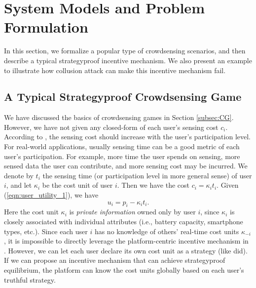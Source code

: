 \documentclass[conference]{IEEEtran}
\theoremstyle{definition}
\begin{document}
{\color{black}
\section{System Models and Problem Formulation}
\label{sec:PFSM}
{\color{black}
In this section, we formalize a popular type of crowdsensing scenarios, and then describe a typical strategyproof incentive mechanism. We also present an example to illustrate how collusion attack can make this incentive mechanism fail. %
}

\subsection{\color{black} A Typical Strategyproof Crowdsensing Game}
We have discussed the basics of crowdsensing games in Section \ref{subsec:CG}. However, we have not given any closed-form of each user\rq{}s sensing cost $c_i$. According to \cite{koutsopoulos2013optimal}, the sensing cost should increase with the user\rq{}s participation level. For real-world applications, usually sensing time can be a good metric of each user's participation. For example, more time the user spends on sensing, more sensed data the user can contribute, and more sensing cost may be incurred. We denote by $t_i$ the sensing time (or participation level in more general sense) of user $i$, and let $\kappa_i$ be the cost unit of user $i$. Then we have the cost $c_i=\kappa_it_i$. Given (\ref{eqn:user_utility_1}), we have
\begin{equation}
\label{eqn:user_utility_2}
u_i = p_i-\kappa_it_i.
\end{equation}
Here the cost unit $\kappa_i$ is \emph{private information} owned only by user $i$, since $\kappa_i$ is closely associated with individual attributes (i.e., battery capacity, smartphone types, etc.). Since each user $i$ has no knowledge of others\rq{} real-time cost units $\kappa_{-i}$, it is impossible to directly leverage the platform-centric incentive mechanism in \cite{yang2012crowdsourcing}. However, we can let each user declare its own cost unit as a strategy (like \cite{zhong2007designing} did). If we can propose an incentive mechanism that can achieve strategyproof equilibrium, the platform can know the cost units globally based on each user\rq{}s truthful strategy.

}
\end{document}
